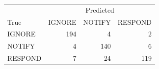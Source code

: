\begin{tabular}{lrrr}
\toprule
 & \multicolumn{3}{c}{Predicted} \\
True & IGNORE & NOTIFY & RESPOND \\
\midrule
IGNORE & 194 & 4 & 2 \\
NOTIFY & 4 & 140 & 6 \\
RESPOND & 7 & 24 & 119 \\
\bottomrule
\end{tabular}
